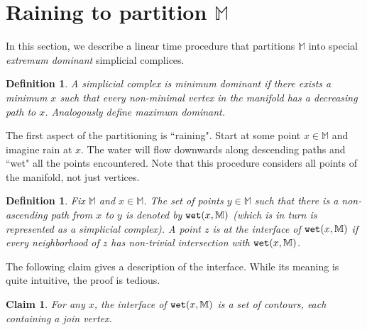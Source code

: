 \documentclass[11pt]{article}
\newtheorem{claim}[theorem]{Claim}
\newtheorem{definition}[theorem]{Definition}
\theoremstyle{definition}
\newcommand{\MM}{\mathbb{M}}
\newcommand{\wet}{{\tt wet}}
\begin{document}
\section{Raining to partition $\MM$} \label{sec:rain}

In this section, we describe a linear time procedure that partitions $\MM$ into special
\emph{extremum dominant} simplicial complices.

\begin{definition} \label{def:dom} A simplicial complex is \emph{minimum dominant} if there exists
a minimum $x$ such that every non-minimal \emph{vertex} in the manifold has a decreasing path to $x$.
Analogously define \emph{maximum dominant}. 
\end{definition}

The first aspect of the partitioning is ``raining". Start at some point $x \in \MM$ and imagine rain at $x$.
The water will flow downwards along descending paths and ``wet" all the points encountered. Note that this procedure considers all points
of the manifold, not just vertices.

\begin{definition} \label{def:wet} Fix $\MM$ and $x \in \MM$. The set of points $y \in \MM$ such that there is a non-ascending path from $x$ to $y$
is denoted by $\wet(x,\MM)$ (which is in turn is represented as a simplicial complex). A point $z$ is at the \emph{interface} of $\wet(x,\MM)$ if every neighborhood of $z$
has non-trivial intersection with $\wet(x,\MM)$.
\end{definition}

The following claim gives a description of the interface. While its meaning is quite intuitive, the proof is tedious.

\begin{claim} \label{clm:inter} For any $x$, the interface of $\wet(x,\MM)$ is a set of contours,
each containing a join vertex.
\end{claim}
\end{document}
